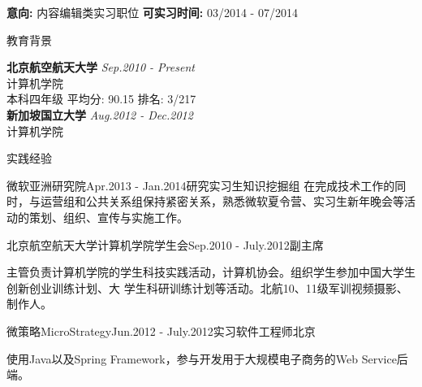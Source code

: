 \documentclass{resume} %
\begin{document}
{\bf 意向: }内容编辑类实习职位 \hspace{2em}
{\bf 可实习时间: }03/2014 - 07/2014


\begin{rSection}{教育背景}

{\bf 北京航空航天大学} \hfill {\em Sep.2010 - Present} \\ 
计算机学院 \\
本科四年级 平均分: 90.15 排名: 3/217\\
{\bf 新加坡国立大学} \hfill {\em Aug.2012 - Dec.2012} \\
计算机学院 

\end{rSection}


\begin{rSection}{实践经验}

\begin{rSubsection}{微软亚洲研究院}{Apr.2013 - Jan.2014}{研究实习生}{知识挖掘组}
在完成技术工作的同时，与运营组和公共关系组保持紧密关系，熟悉微软夏令营、实习生新年晚会等活动的策划、组织、宣传与实施工作。
\end{rSubsection}


\begin{rSubsection}{北京航空航天大学计算机学院学生会}{Sep.2010 - July.2012}{副主席}{}
\item 主管负责计算机学院的学生科技实践活动，计算机协会。组织学生参加中国大学生创新创业训练计划、大
学生科研训练计划等活动。北航10、11级军训视频摄影、制作人。
\end{rSubsection}


\begin{rSubsection}{微策略MicroStrategy}{Jun.2012 - July.2012}{实习软件工程师}{北京}
\item 使用Java以及Spring Framework，参与开发用于大规模电子商务的Web Service后端。
\end{rSubsection}

\end{rSection}
\end{document}
